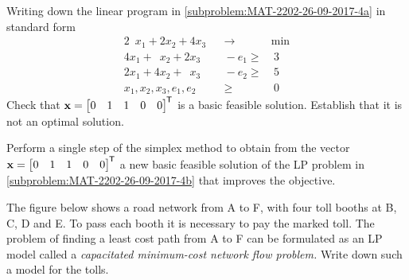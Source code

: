 \begin{subproblem}
    \label{subproblem:MAT-2202-26-09-2017-4b}
    Writing down the linear program in \cref{subproblem:MAT-2202-26-09-2017-4a} in standard form
    \begin{alignat*}{2}
        \phantom{2}x_1 + 2 x_2 + 4x_3 && \to &\min \\
        4x_1 + \phantom{2}x_2 + 2x_3 &&{}- e_1 \geq & \ 3 \\
        2x_1 + 4x_2 + \phantom{4}x_3 &&{}- e_2 \geq & \ 5 \\
        x_1, x_2,x_3,e_1,e_2 &&  \geq & \ 0 
    \end{alignat*}
    Check that $\vx = \mat{0&1&1&0&0}\tran$ is a basic feasible solution. Establish that it is not an optimal solution.
\end{subproblem}

\begin{subproblem}
    Perform a single step of the simplex method
    to obtain from the vector $\vx = \mat{0&1&1&0&0}\tran$ a new basic feasible solution
    of the LP problem in
    \cref{subproblem:MAT-2202-26-09-2017-4b}
    that improves the objective.
\end{subproblem}

\begin{subproblem}
    The figure below shows a road network from A to F,
    with four toll booths at B, C, D and E. To pass each booth
    it is necessary to pay the marked toll. The problem of
    finding a least cost path from A to F can be formulated
    as an LP model called a \emph{capacitated minimum-cost network
    flow problem.} Write down such a model for the tolls.
    \begin{center}
        \parbox{\linewidth}{}
    \end{center}
\end{subproblem}


